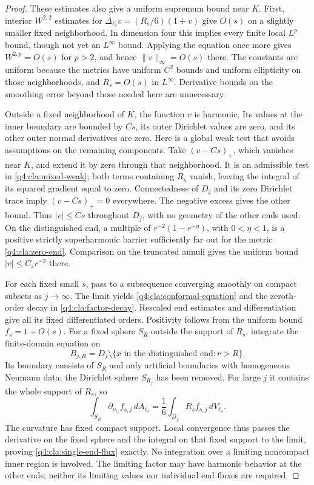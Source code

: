 \begin{proof}
These estimates also give a uniform supremum bound near $K$.
First, interior $W^{2,2}$ estimates for
$\Delta_{\ell_s}v=(R_s/6)(1+v)$ give $O(s)$ on a slightly smaller
fixed neighborhood.  In dimension four this implies every finite
local $L^p$ bound, though not yet an $L^\infty$ bound.
Applying the equation once more gives $W^{2,p}=O(s)$ for $p>2$,
and hence $\|v\|_\infty=O(s)$ there.
The constants are uniform because the metrics have uniform $C^2$
bounds and uniform ellipticity on those neighborhoods, and
$R_s=O(s)$ in $L^\infty$.  Derivative bounds on the smoothing error
beyond those needed here are unnecessary.

Outside a fixed neighborhood of $K$, the function $v$ is harmonic.
Its values at the inner boundary are bounded by $Cs$, its outer
Dirichlet values are zero, and its other outer normal derivatives
are zero.  Here is a global weak test that avoids assumptions on the
remaining components.  Take $(v-Cs)_+$, which vanishes near $K$, and
extend it by zero through that neighborhood.  It is an admissible test
in \eqref{q4:cla:mixed-weak}; both terms containing $R_s$ vanish, leaving
the integral of its squared gradient equal to zero.  Connectedness of
$D_j$ and its zero Dirichlet trace imply $(v-Cs)_+=0$ everywhere.
The negative excess gives the other bound.  Thus $|v|\le Cs$
throughout $D_j$, with no geometry of the other ends used.
On the distinguished end, a multiple of
$r^{-2}(1-r^{-\eta})$, with $0<\eta<1$, is a positive strictly
superharmonic barrier sufficiently far out for the metric
\eqref{q4:cla:zero-end}.  Comparison on the truncated annuli gives
the uniform bound $|v|\le C_s r^{-2}$ there.

For each fixed small $s$, pass to a subsequence converging smoothly
on compact subsets as $j\to\infty$.  The limit yields
\eqref{q4:cla:conformal-equation} and the zeroth-order decay in
\eqref{q4:cla:factor-decay}.  Rescaled end estimates and differentiation
give all its fixed differentiated orders.  Positivity follows from
the uniform bound $f_s=1+O(s)$.
For a fixed sphere $S_R$ outside the support of $R_s$, integrate
the finite-domain equation on
\[
 B_{j,R}=D_j\setminus\{x\text{ in the distinguished end}:r>R\}.
\]
Its boundary consists of $S_R$ and only artificial boundaries with
homogeneous Neumann data; the Dirichlet sphere $S_{R_j}$ has been
removed.  For large $j$ it contains the whole support of $R_s$, so
\[
 \int_{S_R}\partial_{\nu_{\ell_s}}f_{s,j}\,dA_{\ell_s}
       =\frac16\int_{D_j}R_sf_{s,j}\,dV_{\ell_s}.
\]
The curvature has fixed compact support.  Local convergence thus
passes the derivative on the fixed sphere and the integral on that
fixed support to the limit, proving \eqref{q4:cla:single-end-flux} exactly.
No integration over a limiting noncompact inner region is involved.
The limiting factor may have harmonic behavior at the other ends;
neither its limiting values nor individual end fluxes are required.


\end{proof}

